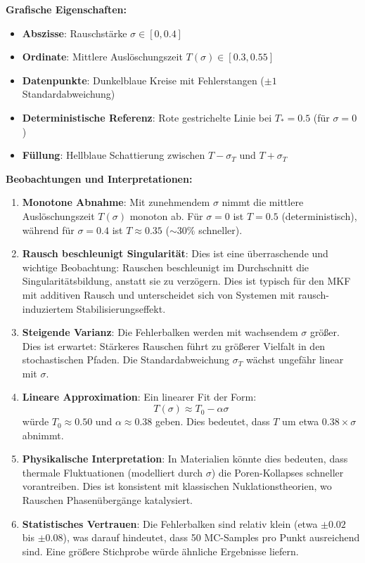 \documentclass[a4paper,12pt]{article}
\theoremstyle{definition}
\begin{document}
\textbf{Grafische Eigenschaften:}
\begin{itemize}
	\item \textbf{Abszisse}: Rauschstärke $\sigma \in [0, 0.4]$
	\item \textbf{Ordinate}: Mittlere Auslöschungszeit $T(\sigma) \in [0.3, 0.55]$
	\item \textbf{Datenpunkte}: Dunkelblaue Kreise mit Fehlerstangen ($\pm 1$ Standardabweichung)
	\item \textbf{Deterministische Referenz}: Rote gestrichelte Linie bei $T_* = 0.5$ (für $\sigma = 0$)
	\item \textbf{Füllung}: Hellblaue Schattierung zwischen $T - \sigma_T$ und $T + \sigma_T$
\end{itemize}

\textbf{Beobachtungen und Interpretationen:}

\begin{enumerate}
	\item \textbf{Monotone Abnahme}: Mit zunehmendem $\sigma$ nimmt die mittlere Auslöschungszeit $T(\sigma)$ monoton ab. Für $\sigma = 0$ ist $T = 0.5$ (deterministisch), während für $\sigma = 0.4$ ist $T \approx 0.35$ ($\sim 30\%$ schneller).
	
	\item \textbf{Rausch beschleunigt Singularität}: Dies ist eine überraschende und wichtige Beobachtung: Rauschen beschleunigt im Durchschnitt die Singularitätsbildung, anstatt sie zu verzögern. Dies ist typisch für den MKF mit additiven Rausch und unterscheidet sich von Systemen mit rausch-induziertem Stabilisierungseffekt.
	
	\item \textbf{Steigende Varianz}: Die Fehlerbalken werden mit wachsendem $\sigma$ größer. Dies ist erwartet: Stärkeres Rauschen führt zu größerer Vielfalt in den stochastischen Pfaden. Die Standardabweichung $\sigma_T$ wächst ungefähr linear mit $\sigma$.
	
	\item \textbf{Lineare Approximation}: Ein linearer Fit der Form:
	\[
	T(\sigma) \approx T_0 - \alpha \sigma
	\]
	würde $T_0 \approx 0.50$ und $\alpha \approx 0.38$ geben. Dies bedeutet, dass $T$ um etwa $0.38 \times \sigma$ abnimmt.
	
	\item \textbf{Physikalische Interpretation}: In Materialien könnte dies bedeuten, dass thermale Fluktuationen (modelliert durch $\sigma$) die Poren-Kollapses schneller vorantreiben. Dies ist konsistent mit klassischen Nuklationstheorien, wo Rauschen Phasenübergänge katalysiert.
	
	\item \textbf{Statistisches Vertrauen}: Die Fehlerbalken sind relativ klein (etwa $\pm 0.02$ bis $\pm 0.08$), was darauf hindeutet, dass 50 MC-Samples pro Punkt ausreichend sind. Eine größere Stichprobe würde ähnliche Ergebnisse liefern.
\end{enumerate}
\end{document}
